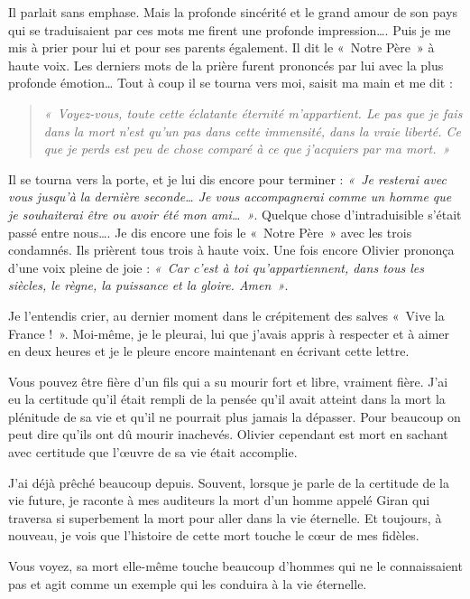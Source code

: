 Il parlait sans emphase. Mais la profonde sincérité et le grand amour de son pays qui se
traduisaient par ces mots me firent une profonde impression…. Puis je me mis à prier pour lui et
pour ses parents également. Il dit le «~Notre Père~» à haute voix. Les derniers mots de la prière
furent prononcés par lui avec la plus profonde émotion… Tout à coup il se tourna vers moi, saisit
ma main et me dit :

\begin{quote}\itshape
«~Voyez-vous, toute cette éclatante éternité m’appartient. Le pas que je fais dans la mort n’est qu’un pas
dans cette immensité, dans la vraie liberté. Ce que je perds est peu de chose comparé à ce que j’acquiers
par ma mort.~»
\end{quote}


Il se tourna vers la porte, et je lui dis encore pour terminer : \textit{«~Je resterai avec vous jusqu’à la
dernière seconde… Je vous accompagnerai comme un homme que je souhaiterai être ou avoir été
mon ami…~»}. Quelque chose d’intraduisible s’était passé entre nous….
Je dis encore une fois le «~Notre Père~» avec les trois condamnés. Ils prièrent tous trois à haute
voix. Une fois encore Olivier prononça d’une voix pleine de joie : \textit{«~Car c’est à toi
qu’appartiennent, dans tous les siècles, le règne, la puissance et la gloire. Amen~»}.

Je l’entendis crier, au dernier moment dans le crépitement des salves «~Vive la France !~».
Moi-même, je le pleurai, lui que j’avais appris à respecter et à aimer en deux heures et je le pleure
encore maintenant en écrivant cette lettre.

Vous pouvez être fière d’un fils qui a su mourir fort et libre, vraiment fière. J’ai eu la certitude
qu’il était rempli de la pensée qu’il avait atteint dans la mort la plénitude de sa vie et qu’il ne
pourrait plus jamais la dépasser. Pour beaucoup on peut dire qu’ils ont dû mourir inachevés.
Olivier cependant est mort en sachant avec certitude que l’œuvre de sa vie était accomplie.

J’ai déjà prêché beaucoup depuis. Souvent, lorsque je parle de la certitude de la vie future, je
raconte à mes auditeurs la mort d’un homme appelé Giran qui traversa si superbement la mort
pour aller dans la vie éternelle. Et toujours, à nouveau, je vois que l’histoire de cette mort touche
le cœur de mes fidèles.

Vous voyez, sa mort elle-même touche beaucoup d’hommes qui ne le connaissaient pas et agit
comme un exemple qui les conduira à la vie éternelle.

